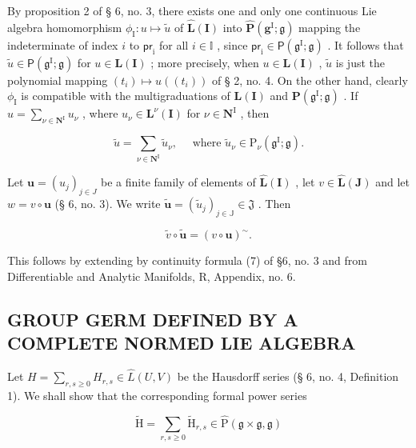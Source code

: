 By proposition 2 of § 6, no. 3, there exists one and only one continuous Lie algebra homomorphism \(\phi_{\mathrm{I}}:u\mapsto \tilde{u}\) of \(\hat{\mathbf{L}} (\mathbf{I})\) into \(\hat{\mathbf{P}} (\mathbf{g}^{\mathrm{I}};\mathfrak{g})\) mapping the indeterminate of index \(i\) to \(\mathsf{pr}_{\mathrm{i}}\) for all \(i\in \mathbb{I}\) , since \(\mathsf{pr}_{\mathrm{i}}\in \mathsf{P}(\mathfrak{g}^{\mathrm{I}};\mathfrak{g})\) . It follows that \(\tilde{u}\in \mathsf{P}(\mathfrak{g}^{\mathrm{I}};\mathfrak{g})\) for \(u\in \mathbf{L}(\mathbf{I})\) ; more precisely, when \(u\in \mathbf{L}(\mathbf{I})\) , \(\tilde{u}\) is just the polynomial mapping \((t_i)\mapsto u((t_i))\) of § 2, no. 4. On the other hand, clearly \(\phi_{\mathrm{I}}\) is compatible with the multigraduations of \(\mathbf{L}(\mathbf{I})\) and \(\mathbf{P}(\mathfrak{g}^{\mathrm{I}};\mathfrak{g})\) . If \(u = \sum_{\nu \in \mathbf{N}^{\mathrm{I}}}u_{\nu}\) , where \(u_{\nu}\in \mathbf{L}^{\nu}(\mathbf{I})\) for \(\nu \in \mathbf{N}^{\mathrm{I}}\) , then

\[
\tilde {u} = \sum_ {\nu \in \mathbf {N} ^ {\mathrm{I}}}  \tilde {u} _ {\nu}, \quad \text { where } \tilde {u} _ {\nu} \in \mathrm{P} _ {\nu} (\mathfrak {g} ^ {\mathrm{I}}; \mathfrak {g}).
\]

Let \(\pmb{u} = (u_j)_{j\in J}\) be a finite family of elements of \(\hat{\mathbf{L}} (\mathbf{I})\) , let \(v\in \hat{\mathbf{L}} (\mathbf{J})\) and let \(w = v\circ \pmb {u}\) (§ 6, no. 3). We write \(\tilde{\pmb{u}} = (\tilde{u}_j)_{j\in \mathbb{J}}\in \mathfrak{J}\) . Then

\[
\tilde {v} \circ \tilde {\boldsymbol {u}} = (v \circ \boldsymbol {u}) ^ {\sim}.\tag{2}
\]

This follows by extending by continuity formula (7) of §6, no. 3 and from Differentiable and Analytic Manifolds, R, Appendix, no. 6.

\subsection{GROUP GERM DEFINED BY A COMPLETE NORMED LIE ALGEBRA}

Let \(H = \sum_{r,s \geqslant 0} H_{r,s} \in \hat{L}(U, V)\) be the Hausdorff series (§ 6, no. 4, Definition 1). We shall show that the corresponding formal power series

\[
\tilde {\mathrm{H}} = \sum_ {r, s \geqslant 0} \tilde {\mathrm{H}} _ {r, s} \in \hat {\mathrm{P}} (\mathfrak {g} \times \mathfrak {g}, \mathfrak {g})\tag{3}
\]

